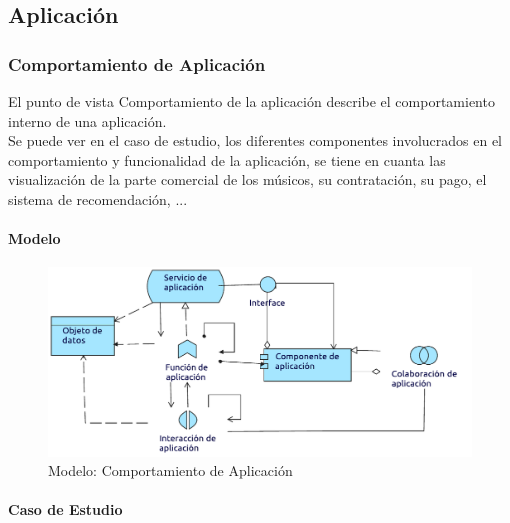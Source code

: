 \subsection{Aplicación}

\subsubsection{Comportamiento de Aplicación}
El punto de vista Comportamiento de la aplicación describe el comportamiento interno de una aplicación.\\

Se puede ver en el caso de estudio, los diferentes componentes involucrados en el comportamiento y funcionalidad de la aplicación, se tiene en cuanta las visualización de la parte comercial de los músicos, su contratación, su pago, el sistema de recomendación, ...
\paragraph{Modelo}
\begin{figure}[h!]
	\centering
	\includegraphics[width=0.8\linewidth]{Desarrollo/ArquitecturaEmpresarial/Aplicacion/imgs/ComportamientoMetamodelo.pdf}
	\caption{Modelo: Comportamiento de Aplicación}
\end{figure}
\newpage
\paragraph{Caso de Estudio}

